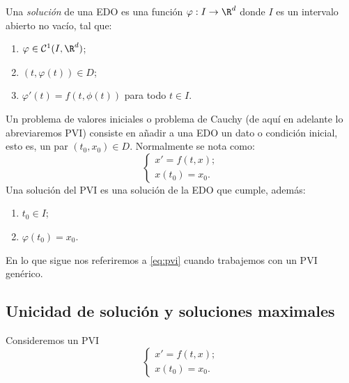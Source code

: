 \documentclass{article}
\begin{document}
  \begin{definition}
    Una \emph{solución} de una EDO es una función $\varphi: I \to \R^d$ donde $I$ es un intervalo abierto
    no vacío, tal que:
    \begin{enumerate}
    \item $\varphi \in \mathcal{C}^1(I, \R^d)$;
    \item $(t, \varphi(t)) \in D$;
    \item $\varphi'(t) = f(t, \phi(t))$ para todo $t \in I$.
    \end{enumerate}
  \end{definition}


  
  \begin{definition}
    Un problema de valores iniciales o problema de Cauchy (de aquí en adelante lo abreviaremos PVI)
    consiste en añadir a una EDO un dato o condición inicial, esto es, un par $(t_0, x_0) \in D$.
    Normalmente se nota como:
    \begin{equation}
      \label{eq:pvi}
      \left\{
        \begin{array}{l}
          x' = f(t,x); \\
          x(t_0) = x_0.
        \end{array}
      \right.
      \tag{P}
    \end{equation}
    Una solución del PVI es una solución de la EDO que cumple, además:
    \begin{enumerate}
    \item $t_0 \in I$;
    \item $\varphi(t_0) = x_0$.
    \end{enumerate}
  \end{definition}

  En lo que sigue nos referiremos a \eqref{eq:pvi} cuando trabajemos con un PVI genérico. 
  
  \subsection{Unicidad de solución y soluciones maximales}

  Consideremos un PVI
  \begin{equation}
    \left\{
      \begin{array}{l}
        x' = f(t,x); \\
        x(t_0) = x_0.
      \end{array}
    \right.
    \tag{P}
  \end{equation}
\end{document}
